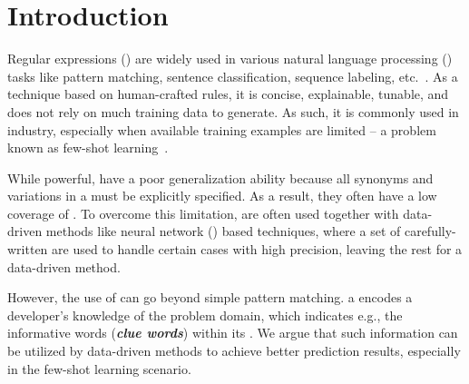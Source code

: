 \section{Introduction}


Regular expressions (\REs) are widely used in various natural language processing (\NLP) tasks like pattern matching, sentence
classification, sequence labeling, etc.~\cite{chang2014tokensregex}.
As a technique based on human-crafted rules, it is concise, explainable, tunable, and does not rely on much training data to generate. As
such, it is commonly used in industry, especially when available training examples are limited -- a problem known as few-shot
learning~\cite{gc2015big}.

While powerful, \REs have a poor generalization ability because all synonyms and variations in a \RE must be explicitly specified. As a
result, they often have a low coverage of . To overcome this limitation, \REs are often used together with
data-driven methods like neural network (\NN) based techniques, where a set of carefully-written \REs are used to handle certain cases with
high precision, leaving the rest for a data-driven method.

However, the use of \REs can go beyond simple pattern matching.
a \RE {} encodes a developer's knowledge of the problem domain, which indicates e.g., the informative words (\textbf{\textit{clue
words}}) within its . %
We argue that such information can be utilized by data-driven methods to achieve better prediction results, especially in the few-shot
learning scenario.




